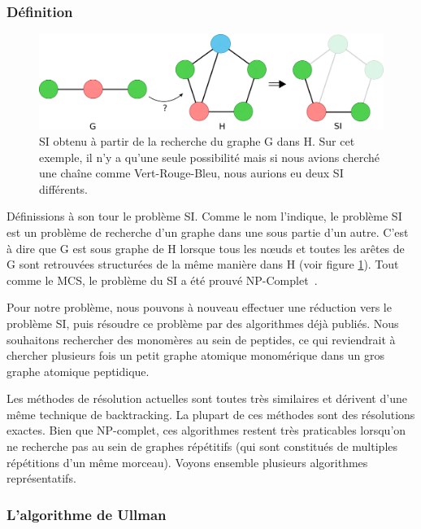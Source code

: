 \label{SI_p}

\subsubsection{Définition}

\begin{figure}[!ht]
  \begin{center}
    \includegraphics[width=450px]{Figures/s2m/MCS-SI/si.png}
    \caption{\label{SI_fig}SI obtenu à partir de la recherche du graphe G dans H.
    Sur cet exemple, il n'y a qu'une seule possibilité mais si nous avions cherché une chaîne comme Vert-Rouge-Bleu, nous aurions eu deux SI différents.}
  \end{center}
\end{figure}

Définissions à son tour le problème SI.
Comme le nom l'indique, le problème SI est un problème de recherche d'un graphe dans une sous partie d'un autre.
C'est à dire que G est sous graphe de H lorsque tous les n\oe{}uds et toutes les arêtes de G sont retrouvées structurées de la même manière dans H (voir figure \ref{SI_fig}).
Tout comme le MCS, le problème du SI a été prouvé NP-Complet~\cite{garey_computers_1979}.

Pour notre problème, nous pouvons à nouveau effectuer une réduction vers le problème SI, puis résoudre ce problème par des algorithmes déjà publiés.
Nous souhaitons rechercher des monomères au sein de peptides, ce qui reviendrait à chercher plusieurs fois un petit graphe atomique monomérique dans un gros graphe atomique peptidique.

Les méthodes de résolution actuelles sont toutes très similaires et dérivent d'une même technique de backtracking.
La plupart de ces méthodes sont des résolutions exactes.
Bien que NP-complet, ces algorithmes restent très praticables lorsqu'on ne recherche pas au sein de graphes répétitifs (qui sont constitués de multiples répétitions d'un même morceau).
Voyons ensemble plusieurs algorithmes représentatifs.


\subsubsection{L'algorithme de Ullman}

